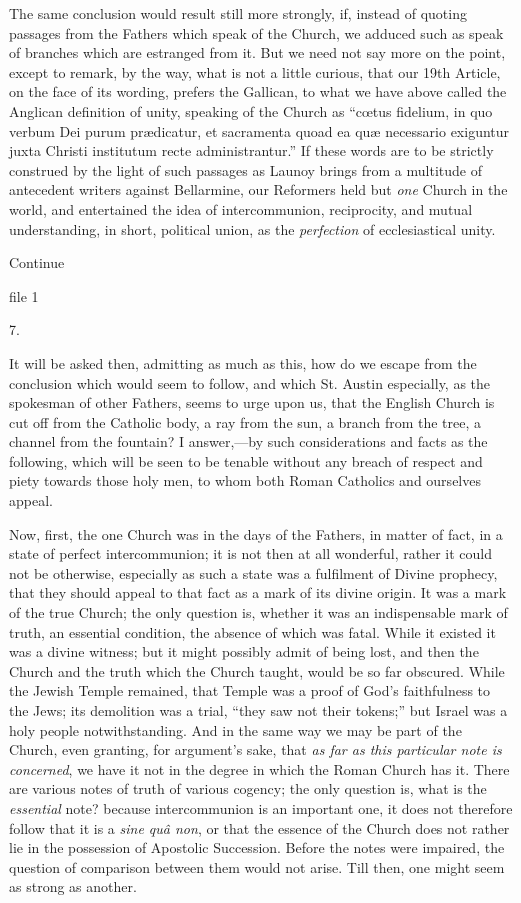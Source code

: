 The same conclusion would result still more
strongly, if, instead of quoting passages from the Fathers which speak
of the Church, we adduced such as speak of branches which are
estranged from it. But we need not say more on the point, except to
remark, by the way, what is not a little curious, that our 19th
Article, on the face of its wording, prefers the Gallican, to what we
have above called the Anglican definition of unity, speaking of the
Church as ``cœtus fidelium, in quo verbum Dei purum prædicatur, et
sacramenta quoad ea quæ necessario exiguntur juxta Christi institutum
recte administrantur.'' If these words are to be strictly construed by
the light of such passages as Launoy brings from a multitude of
antecedent writers against Bellarmine, our Reformers held but \emph{one}
Church in the world, and entertained the idea of intercommunion,
reciprocity, and mutual understanding, in short, political union, as
the \emph{perfection} of ecclesiastical unity.

Continue


file 1

7.

It will be asked then, admitting as much as this,
how do we escape from the conclusion which would seem to follow, and
which St. Austin especially, as the spokesman of other Fathers, seems
to urge upon us, that the English Church is cut off from the
Catholic body, a ray from the sun, a branch from the tree, a channel
from the fountain? I answer,—by such considerations and facts as the
following, which will be seen to be tenable without any breach of
respect and piety towards those holy men, to whom both Roman Catholics
and ourselves appeal.

Now, first, the one Church was in the days of the
Fathers, in matter of fact, in a state of perfect intercommunion; it
is not then at all wonderful, rather it could not be otherwise,
especially as such a state was a fulfilment of Divine prophecy, that
they should appeal to that fact as a mark of its divine origin. It was
a mark of the true Church; the only question is, whether it was an
indispensable mark of truth, an essential condition, the absence of
which was fatal. While it existed it was a divine witness; but it
might possibly admit of being lost, and then the Church and the truth
which the Church taught, would be so far obscured. While the Jewish
Temple remained, that Temple was a proof of God's faithfulness to
the Jews; its demolition was a trial, ``they saw not their tokens;''
but Israel was a holy people notwithstanding. And in the same way we
may be part of the Church, even granting, for argument's sake, that \emph{as
far as this particular note is concerned}, we have it not in the
degree in which the Roman Church has it. There are various notes of
truth of various cogency; the only question is, what is the \emph{essential}
note? because intercommunion is an important one, it does not
therefore follow that it is a \emph{sine quâ non}, or that the
essence of the Church does not rather lie in the possession of
Apostolic Succession. Before the notes were impaired, the question of
comparison between them would not arise. Till then, one might seem as
strong as another.

